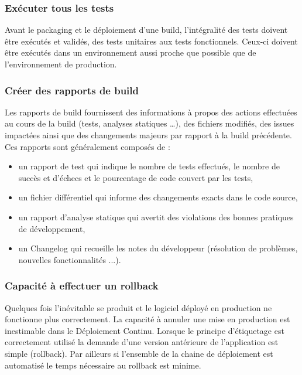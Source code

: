       \subsubsection{Exécuter tous les tests}
      Avant le packaging et le déploiement d’une build, l’intégralité des tests doivent être exécutés et validés, des tests unitaires aux tests fonctionnels. Ceux-ci doivent être exécutés dans un environnement aussi proche que possible que de l’environnement de production.

      \subsubsection{Créer des rapports de build}
      Les rapports de build fournissent des informations à propos des actions effectuées au cours de la build (tests, analyses statiques …), des fichiers modifiés, des issues impactées ainsi que des changements majeurs par rapport à la build précédente. Ces rapports sont généralement composés de :\\
      \begin{itemize}
        \item un rapport de test qui indique le nombre de tests effectués, le nombre de succès et d’échecs et le pourcentage de code couvert par les tests,
        \item un fichier différentiel qui informe des changements exacts dans le code source,
        \item un rapport d’analyse statique qui avertit des violations des bonnes pratiques de développement,
        \item un Changelog qui recueille les notes du développeur (résolution de problèmes, nouvelles fonctionnalités ...).\\
      \end{itemize}

      \subsubsection{Capacité à effectuer un rollback}
      Quelques fois l’inévitable se produit et le logiciel déployé en production ne fonctionne plus correctement. La capacité à annuler une mise en production est inestimable dans le Déploiement Continu. Lorsque le principe d’étiquetage est correctement utilisé la demande d’une version antérieure de l’application est simple (\gls{rollback}). Par ailleurs si l’ensemble de la chaine de déploiement est automatisé le temps nécessaire au rollback est minime.

